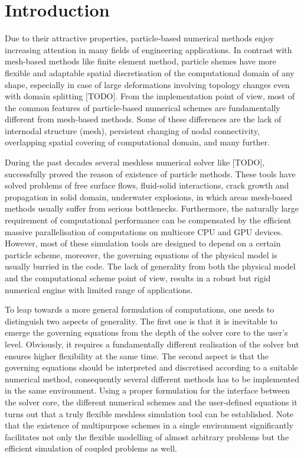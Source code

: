 \documentclass[a4paper,12pt,openany]{book}
\theoremstyle{break}
\begin{document}
\section{Introduction}
Due to their attractive properties, particle-based numerical methods enjoy increasing attention in many fields of engineering applications. In contrast with mesh-based methods  like finite element method, particle shemes have more flexible and adaptable spatial discretisation of the computational domain of any shape, especially in case of large deformations involving topology changes even with domain splitting [TODO].
From the implementation point of view, most of the common features of particle-based numerical schemes are fundamentally different from mesh-based methods. Some of these differences are the lack of internodal structure (mesh), persistent changing of nodal connectivity, overlapping spatial covering of computational domain, and many further.

During the past decades several meshless numerical solver like [TODO], successfully proved the reason of existence of particle methods. These tools have solved problems of free surface flows, fluid-solid interactions, crack growth and propagation in solid domain, underwater explosions, in which areas mesh-based methods usually suffer from serious bottlenecks. Furthermore, the naturally large requirement of computational performance can be compensated by the efficient massive parallelisation of computations on multicore CPU and GPU devices. However, most of these simulation tools are designed to depend on a certain particle scheme, moreover, the governing equations of the physical model is usually burried in the code. The lack of generality from both the physical model and the computational scheme point of view, results in a robust but rigid numerical engine with limited range of applications. %

To leap towards a more general formulation of computations, one needs to distinguish two aspects of generality. The first one is that it is inevitable to emerge the governing equations from the depth of the solver core to the user's level. Obviously, it requires a fundamentally different realisation of the solver but ensures higher flexibility at the same time. The second aspect is that the governing equations should be interpreted and discretised according to a suitable numerical method, consequently several different methods has to be implemented in the same environment. Using a proper formulation for the interface between the solver core, the different numerical schemes and the user-defined equations it turns out that a truly flexible meshless simulation tool can be established. Note that the existence of multipurpose schemes in a single environment significantly facilitates  not only the flexible modelling of almost arbitrary problems but the efficient simulation of coupled problems as well.
\end{document}
